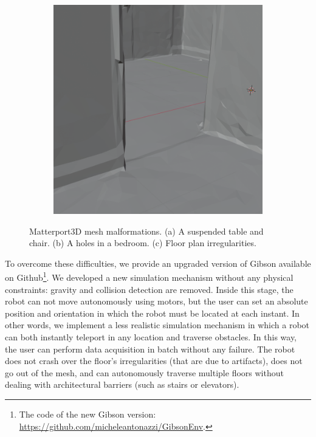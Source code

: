 \begin{figure}[h!]
\begin{subfigure}[b]{0.32\linewidth}
		\caption{}
		\label{fig:matterport_issues_hole}
	\end{subfigure}
	\hfil
	\begin{subfigure}[b]{0.32\linewidth}
		\centering
		\includegraphics[width=\textwidth]{images/floor_plan_irregularity.png}
		\caption{}
		\label{fig:matterport_issues_floor_plan}
	\end{subfigure}
	\caption{Matterport3D mesh malformations. (a) A suspended table and chair. (b) A holes in a bedroom. (c) Floor plan irregularities.}
\end{figure}


To overcome these difficulties, we provide an upgraded version of Gibson available on Github\footnote{The code of the new Gibson version: \url{https://github.com/micheleantonazzi/GibsonEnv}.}. We developed a new simulation mechanism without any physical constraints: gravity and collision detection are removed. Inside this stage, the robot can not move autonomously using motors, but the user can set an absolute position and orientation in which the robot must be located at each instant. In other words, we implement a less realistic simulation mechanism in which a robot can both instantly teleport in any location and traverse obstacles. In this way, the user can perform data acquisition in batch without any failure. The robot does not crash over the floor's irregularities (that are due to artifacts), does not go out of the mesh, and can autonomously traverse multiple floors without dealing with architectural barriers (such as stairs or elevators).

